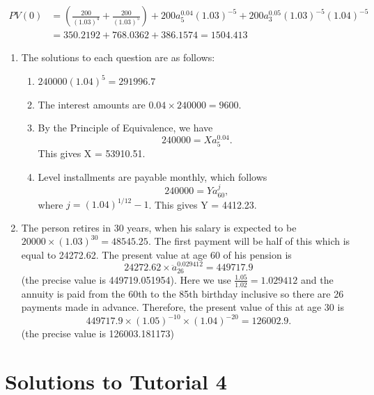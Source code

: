 \documentclass[
]{book}
\providecommand{\tightlist}{%
  \setlength{\itemsep}{0pt}\setlength{\parskip}{0pt}}
\theoremstyle{definition}
\theoremstyle{definition}
\theoremstyle{definition}
\theoremstyle{definition}
\theoremstyle{remark}
\begin{document}
\[\begin{aligned}
    PV(0) &= \left( \frac{200}{(1.03)^4} + \frac{200}{(1.03)^5}\right) + 200 a^{0.04}_5 (1.03)^{-5} + 200 a^{0.05}_{3} (1.03)^{-5} (1.04)^{-5} \\
    &= 350.2192 + 768.0362 + 386.1574 = 1504.413
\end{aligned}\]

\begin{enumerate}
\def\labelenumi{\arabic{enumi}.}
\setcounter{enumi}{2}
\item
  The solutions to each question are as follows:

  \begin{enumerate}
  \def\labelenumii{\arabic{enumii}.}
  \tightlist
  \item
    \(240000 (1.04)^5 = 291996.7\)
  \item
    The interest amounts are \(0.04\times 240000 = 9600.\)
  \item
    By the Principle of Equivalence, we have
    \[ 240000 = X a^{0.04}_{5}. \]
    This gives X = 53910.51.
  \item
    Level installments are payable monthly, which follows
    \[ 240000 = Y a^{j}_{60}, \]
    where \(j = (1.04)^{1/12} - 1\). This gives Y = 4412.23.
  \end{enumerate}
\item
  The person retires in 30 years, when his salary is expected to be
  \(20000 \times (1.03)^{30} = 48545.25.\)
  The first payment will be half of this which is equal to 24272.62.
  The present value at age 60 of his pension is
  \[  24272.62 \times \ddot{a}^{0.029412}_{26} = 449717.9\] (the precise value is 449719.051954).
  Here we use \(\frac{1.05}{1.02} = 1.029412\) and the annuity is paid from the 60th to the 85th birthday inclusive so there are 26 payments made in advance.
  Therefore, the present value of this at age 30 is
  \[ 449717.9 \times (1.05)^{-10} \times (1.04)^{-20} = 126002.9. \]
  (the precise value is 126003.181173)
\end{enumerate}

\section{Solutions to Tutorial 4}\label{solutions-to-tutorial-4}
\end{document}
